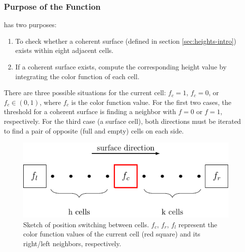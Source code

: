 \subsubsection{Purpose of the Function}\label{sec:heights-purpose}
 has two purposes:
\begin{enumerate}
    \item To check whether a coherent surface (defined in section \ref{sec:heights-intro}) exists within eight adjacent cells.
    \item If a coherent surface exists, compute the corresponding height value by integrating the color function of each cell.
\end{enumerate}
There are three possible situations for the current cell: $f_c=1$, $f_c=0$, or $f_c\in(0,1)$, where $f_c$ is the color function value. For the first two cases, the threshold for a coherent surface is finding a neighbor with $f=0$ or $f=1$, respectively. For the third case (a surface cell), both directions must be iterated to find a pair of opposite (full and empty) cells on each side.

\begin{figure}
    \centering
    \includegraphics{./image/heights-h/possw}
    \caption{Sketch of position switching between cells. $f_c$, $f_r$, $f_l$ represent the color function values of the current cell (red square) and its right/left neighbors, respectively.}
    \label{fig:heights-possw}
\end{figure}


